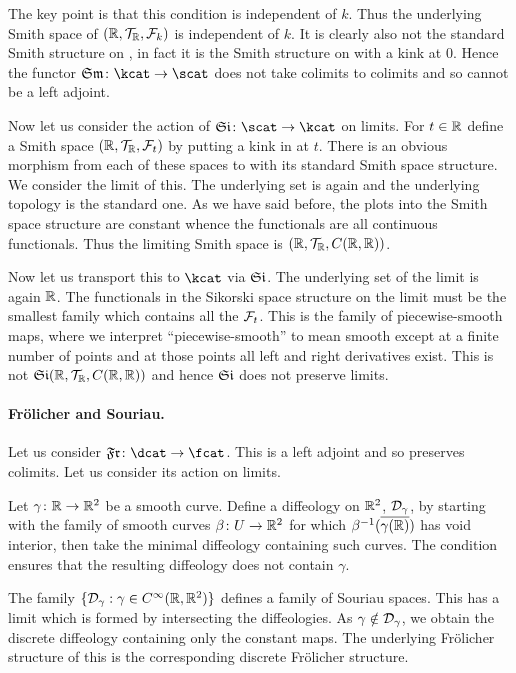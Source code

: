 \documentclass[%
12pt,%
arxiv,%
defaults
]{myclass}
\begin{document}
The key point is that this condition is independent of \(k\).
Thus the underlying Smith space of
 \((\mathbb{R}, \mathcal{T}_{\mathbb{R}}, \mathcal{F}_k)\)
is independent of \(k\).
It is clearly also not the standard Smith structure on \R, in fact it is the Smith structure on \R with a kink at \(0\).
Hence the functor
 \(\SiSm \colon \kcat \to \scat\)
does not take colimits to colimits and so cannot be a left adjoint.

\medskip

Now let us consider the action of
 \(\SmSi \colon \scat \to \kcat\)
on limits.
For \(t \in \mathbb{R}\) define a Smith space
 \((\mathbb{R}, \mathcal{T}_\mathbb{R}, \mathcal{F}_t)\)
by putting a kink in \R at \(t\).
There is an obvious morphism from each of these spaces to \R with its standard Smith space structure.
We consider the limit of this.
The underlying set is again \R and the underlying topology is the standard one.
As we have said before,  the plots into the Smith space structure are constant whence the functionals are all continuous functionals.
Thus the limiting Smith space is \((\mathbb{R}, \mathcal{T}_\mathbb{R}, C(\mathbb{R},\mathbb{R}))\).

Now let us transport this to \(\kcat\) via \(\SmSi\).
The underlying set of the limit is again \(\mathbb{R}\).
The functionals in the Sikorski space structure on the limit must be the smallest family which contains all the \(\mathcal{F}_t\).
This is the family of piecewise\hyp{}smooth maps, where we interpret ``piecewise\hyp{}smooth'' to mean smooth except at a finite number of points and at those points all left and right derivatives exist.
This is not
 \(\SmSi(\R, \m{T}_\R, C(\R,\R))\)
and hence \(\SmSi\) does not preserve limits.

\paragraph{Fr\"olicher and Souriau.}
Let us consider
 \(\SoFr \colon \dcat \to \fcat\).
This is a left adjoint and so preserves colimits.
Let us consider its action on limits.

Let
 \(\gamma \colon \mathbb{R} \to \mathbb{R}^2\)
be a smooth curve.
Define a diffeology on \(\mathbb{R}^2\), \(\mathcal{D}_{\gamma}\), by starting with the family of smooth curves
 \(\beta \colon U \to \mathbb{R}^2\)
for which
 \(\beta^{-1}(\overline{\gamma(\mathbb{R})})\)
has void interior, then take the minimal diffeology containing such curves.
The condition ensures that the resulting diffeology does not contain \(\gamma\).

The family
 \(\{\mathcal{D}_{\gamma} : \gamma \in C^\infty(\mathbb{R}, \mathbb{R}^2)\}\)
defines a family of Souriau spaces.
This has a limit which is formed by intersecting the diffeologies.
As
 \(\gamma \notin \mathcal{D}_{\gamma}\),
we obtain the discrete diffeology containing only the constant maps.
The underlying Fr\"olicher structure of this is the corresponding discrete Fr\"olicher structure.
\end{document}
